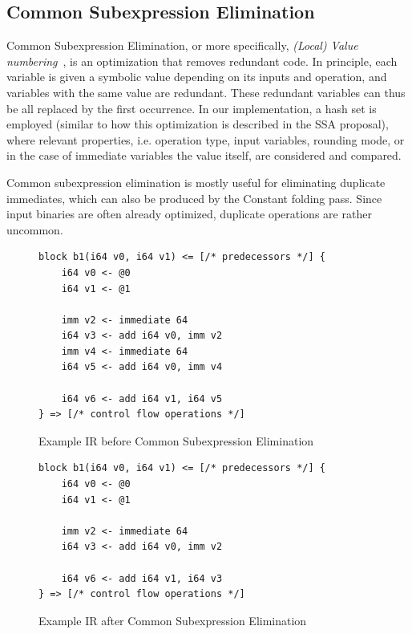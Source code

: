 \documentclass[course=eragp]{aspdoc}
\begin{document}
\subsection{Common Subexpression Elimination}

Common Subexpression Elimination, or more specifically, \textit{(Local) Value
    numbering}~\cite{ssa_proposal}, is an optimization that removes redundant code. In principle, each variable is given a
symbolic value depending on its inputs and operation, and variables with the same value are redundant. These redundant
variables can thus be all replaced by the first occurrence. In our implementation, a hash set is employed (similar to
how this optimization is described in the SSA proposal), where relevant properties, i.e. operation type, input
variables, rounding mode, or in the case of immediate variables the value itself, are considered and compared.

Common subexpression elimination is mostly useful for eliminating duplicate immediates, which can also be produced by
the Constant folding pass. Since input binaries are often already optimized, duplicate operations are rather uncommon.

\begin{figure}[H]
    \centering
    \begin{lstlisting}[]
block b1(i64 v0, i64 v1) <= [/* predecessors */] {
    i64 v0 <- @0
    i64 v1 <- @1

    imm v2 <- immediate 64
    i64 v3 <- add i64 v0, imm v2
    imm v4 <- immediate 64
    i64 v5 <- add i64 v0, imm v4

    i64 v6 <- add i64 v1, i64 v5
} => [/* control flow operations */]
\end{lstlisting}
    \caption{Example IR before Common Subexpression Elimination}\label{fig:cse_example_before}
\end{figure}

\begin{figure}[H]
    \centering
    \begin{lstlisting}[]
block b1(i64 v0, i64 v1) <= [/* predecessors */] {
    i64 v0 <- @0
    i64 v1 <- @1

    imm v2 <- immediate 64
    i64 v3 <- add i64 v0, imm v2

    i64 v6 <- add i64 v1, i64 v3
} => [/* control flow operations */]
\end{lstlisting}
    \caption{Example IR after Common Subexpression Elimination}\label{fig:cse_example_after}
\end{figure}
\end{document}
